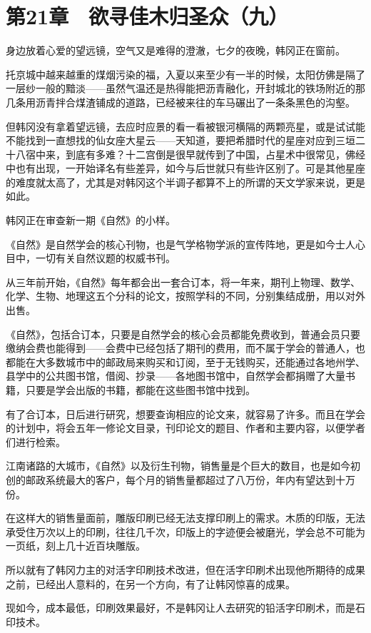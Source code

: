 \section{第21章　欲寻佳木归圣众（九）}

身边放着心爱的望远镜，空气又是难得的澄澈，七夕的夜晚，韩冈正在窗前。

托京城中越来越重的煤烟污染的福，入夏以来至少有一半的时候，太阳仿佛是隔了一层纱一般的黯淡——虽然气温还是热得能把沥青融化，开封城北的铁场附近的那几条用沥青拌合煤渣铺成的道路，已经被来往的车马碾出了一条条黑色的沟壑。

但韩冈没有拿着望远镜，去应时应景的看一看被银河横隔的两颗亮星，或是试试能不能找到一直想找的仙女座大星云——天知道，要把希腊时代的星座对应到三垣二十八宿中来，到底有多难？十二宫倒是很早就传到了中国，占星术中很常见，佛经中也有出现，一开始译名有些差异，如今与后世就只有些许区别了。可是其他星座的难度就太高了，尤其是对韩冈这个半调子都算不上的所谓的天文学家来说，更是如此。

韩冈正在审查新一期《自然》的小样。

《自然》是自然学会的核心刊物，也是气学格物学派的宣传阵地，更是如今士人心目中，一切有关自然议题的权威书刊。

从三年前开始，《自然》每年都会出一套合订本，将一年来，期刊上物理、数学、化学、生物、地理这五个分科的论文，按照学科的不同，分别集结成册，用以对外出售。

《自然》，包括合订本，只要是自然学会的核心会员都能免费收到，普通会员只要缴纳会费也能得到——会费中已经包括了期刊的费用，而不属于学会的普通人，也都能在大多数城市中的邮政局来购买和订阅，至于无钱购买，还能通过各地州学、县学中的公共图书馆，借阅、抄录——各地图书馆中，自然学会都捐赠了大量书籍，只要是学会出版的书籍，都能在这些图书馆中找到。

有了合订本，日后进行研究，想要查询相应的论文来，就容易了许多。而且在学会的计划中，将会五年一修论文目录，刊印论文的题目、作者和主要内容，以便学者们进行检索。

江南诸路的大城市，《自然》以及衍生刊物，销售量是个巨大的数目，也是如今初创的邮政系统最大的客户，每个月的销售量都超过了八万份，年内有望达到十万份。

在这样大的销售量面前，雕版印刷已经无法支撑印刷上的需求。木质的印版，无法承受住万次以上的印刷，往往几千次，印版上的字迹便会被磨光，学会总不可能为一页纸，刻上几十近百块雕版。

所以就有了韩冈力主的对活字印刷技术改进，但在活字印刷术出现他所期待的成果之前，已经出人意料的，在另一个方向，有了让韩冈惊喜的成果。

现如今，成本最低，印刷效果最好，不是韩冈让人去研究的铅活字印刷术，而是石印技术。

